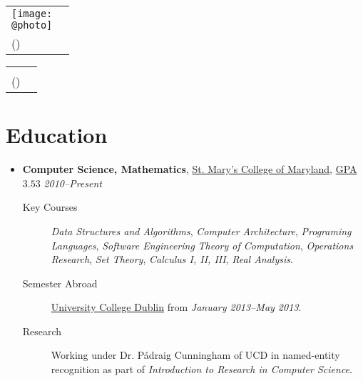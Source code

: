 \documentclass[11pt,letterpaper]{article}
\author{Sean Edward Allred}
\makeatletter
\newcommand{\position}[5]{\item%
  \begin{tabular*}{1.0\linewidth}{l@{\extracolsep{\fill}}r}
    #1 & #2\\
    \textit{#3} & \textit{#4---#5}
  \end{tabular*}}
\renewcommand{\position}[6][\textbullet]{%
\item[#1] \hspace*{-2em}\textbf{#4}, #2, #3\hfill
  \textit{#5--#6}\vspace*{-.8em}}
\renewcommand{\maketitle}{%
  \noindent
  \ifdefined\@photo
  \usepackage{multirow}
  \begin{tabular*}{1.0\linewidth}{l@{\extracolsep{\fill}}r}
    \multirow{2}{*}{\texttt{[image: \\@photo]}}\\
     {\@namestyle\@author}           & \@addressA\\
    {\@emailstyle\@email} (\@phone)  & \@addressB
  \end{tabular*}
  \else
  \begin{tabular*}{1.0\linewidth}{l@{\extracolsep{\fill}}r}
     {\@namestyle\@author}           & \@addressA\\
    {\@emailstyle\@email} (\@phone)  & \@addressB
  \end{tabular*}
  \fi
}
\newcommand{\course}[1]{\textit{#1}}
\makeatother
\begin{document}
\maketitle

\section*{Education}
\begin{itemize}
\position[] {\href{http://www.smcm.edu}
                {St. Mary's College of Maryland}}
          {\href{http://dl.dropbox.com/u/17471132/transcript20130330.pdf}
                {GPA $3.53$}}
          {Computer Science, Mathematics}
          {2010}{Present}
          \begin{description}
          \item[Key Courses] \course{Data Structures and Algorithms},
            \course{Computer Architecture}, \course{Programing
              Languages}, \course{Software Engineering} \course{Theory
              of Computation}, \course{Operations Research},
            \course{Set Theory}, \course{Calculus I, II, III},
            \course{Real Analysis}.
          \item[Semester Abroad] \href{http://www.ucd.ie}{University
              College Dublin} from \textit{January 2013--May 2013}.
          \item[Research] Working under Dr. P\'adraig Cunningham of
            UCD in named-entity recognition as part of
            \textit{Introduction to Research in Computer Science}.
          \end{description}
\end{itemize}
\end{document}
